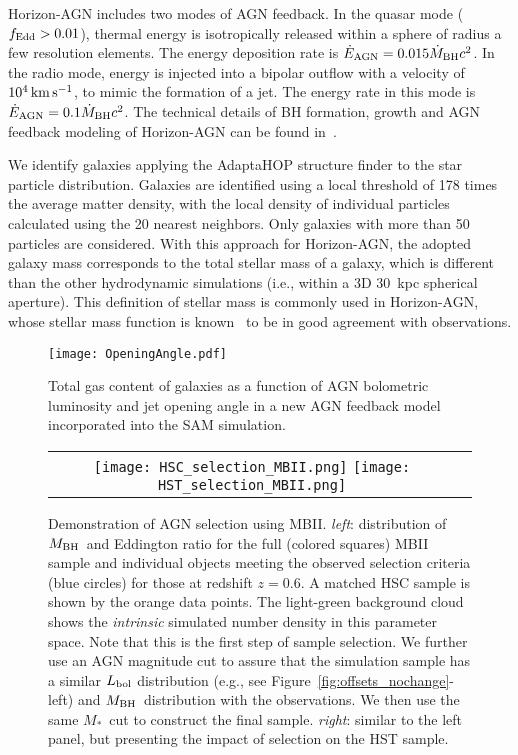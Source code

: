 \documentclass[twocolumn]{aastex631}
\def\smass{{$M_*$}}
\def\mbh{$M_{\rm BH}$}
\begin{document}
Horizon-AGN includes two modes of AGN feedback. In the quasar mode ($f_{\rm Edd}>0.01$), thermal energy is isotropically released within a sphere of radius a few resolution elements. The energy deposition rate is $\dot{E}_{\rm AGN} = 0.015 \dot{M}_{\rm BH} c^2$. In the radio mode, energy is injected into a bipolar  outflow  with  a  velocity  of  $10^4\,\rm km\,s^{-1}$, to  mimic the  formation  of  a  jet.  The  energy  rate  in  this  mode is $\dot{E}_{\rm AGN} = 0.1 \dot{M}_{\rm BH} c^2$.  The  technical  details  of  BH  formation,  growth  and AGN  feedback  modeling  of  Horizon-AGN  can be found in~\citet{2012MNRAS.420.2662D}.

We identify galaxies applying the AdaptaHOP structure finder \citep{Aubert+04,Tweed+09} to the star particle distribution.  Galaxies are identified using a local threshold of 178 times the average matter density, with the local density of individual particles calculated using the 20 nearest neighbors. Only galaxies with more than 50 particles are considered. With this approach for Horizon-AGN, the adopted galaxy mass corresponds to the total stellar mass of a galaxy, which is different than the other hydrodynamic simulations (i.e., within a 3D 30~kpc spherical aperture). This definition of stellar mass is commonly used in Horizon-AGN, whose stellar mass function is known~\citep{2017MNRAS.467.4739K} to be in good agreement with observations.



\begin{figure}
\centering
\texttt{[image: OpeningAngle.pdf]}
\caption{\label{fig:SAM} 
Total gas content of galaxies as a function of AGN bolometric luminosity and jet opening angle in a new AGN feedback model incorporated into the SAM simulation.
}
\end{figure} 

\begin{figure*}
\centering
\begin{tabular}{c c}
{\texttt{[image: HSC\_selection\_MBII.png]}}
{\texttt{[image: HST\_selection\_MBII.png]}}
\end{tabular}
\caption{\label{fig:selection}Demonstration of AGN selection using MBII. {\it left}: distribution of \mbh\ and Eddington ratio for the full (colored squares) MBII sample and individual objects meeting the observed selection criteria (blue circles) for those at redshift $z=0.6$. A matched HSC sample is shown by the orange data points. The light-green background cloud shows the {\it intrinsic} simulated number density in this parameter space. Note that this is the first step of sample selection. We further use an AGN magnitude cut to assure that the simulation sample has a similar $L_{\rm bol}$ distribution (e.g., see Figure~\ref{fig:offsets_nochange}-left) and \mbh\ distribution with the observations. We then use the same \smass\ cut to construct the final sample.
{\it right}: similar to the left panel, but presenting the impact of selection on the HST sample.
}
\end{figure*}
\end{document}

